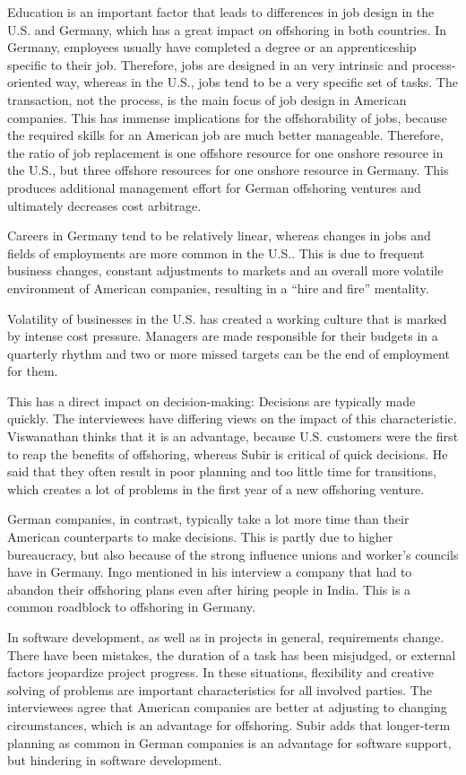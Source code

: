 Education is an important factor that leads to differences in job design in the U.S. and Germany, which has a great impact on offshoring in both countries. In Germany, employees usually have completed a degree or an apprenticeship specific to their job. Therefore, jobs are designed in an very intrinsic and process-oriented way, whereas in the U.S., jobs tend to be a very specific set of tasks. The transaction, not the process, is the main focus of job design in American companies. This has immense implications for the offshorability of jobs, because the required skills for an American job are much better manageable. Therefore, the ratio of job replacement is one offshore resource for one onshore resource in the U.S., but three offshore resources for one onshore resource in Germany. This produces additional management effort for German offshoring ventures and ultimately decreases cost arbitrage.

Careers in Germany tend to be relatively linear, whereas changes in jobs and fields of employments are more common in the U.S.. This is due to frequent business changes, constant adjustments to markets and an overall more volatile environment of American companies, resulting in a ``hire and fire'' mentality. 

Volatility of businesses in the U.S. has created a working culture that is marked by intense cost pressure. Managers are made responsible for their budgets in a quarterly rhythm and two or more missed targets can be the end of employment for them. 

This has a direct impact on decision-making: Decisions are typically made quickly. The interviewees have differing views on the impact of this characteristic. Viswanathan thinks that it is an advantage, because U.S. customers were the first to reap the benefits of offshoring, whereas Subir is critical of quick decisions. He said that they often result in poor planning and too little time for transitions, which creates a lot of problems in the first year of a new offshoring venture.

German companies, in contrast, typically take a lot more time than their American counterparts to make decisions. This is partly due to higher bureaucracy, but also because of the strong influence unions and worker's councils have in Germany. Ingo mentioned in his interview a company that had to abandon their offshoring plans even after hiring people in India. This is a common roadblock to offshoring in Germany.

In software development, as well as in projects in general, requirements change. There have been mistakes, the duration of a task has been misjudged, or external factors jeopardize project progress. In these situations, flexibility and creative solving of problems are important characteristics for all involved parties. The interviewees agree that American companies are better at adjusting to changing circumstances, which is an advantage for offshoring. Subir adds that longer-term planning as common in German companies is an advantage for software support, but hindering in software development.


